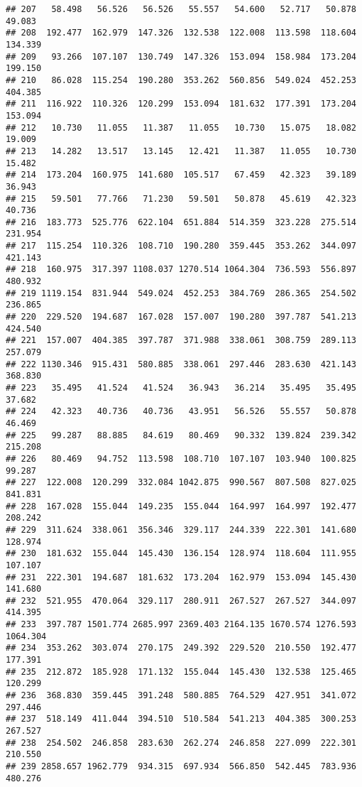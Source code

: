 \documentclass[
]{article}
\begin{document}
\begin{verbatim}
## 207   58.498   56.526   56.526   55.557   54.600   52.717   50.878   49.083
## 208  192.477  162.979  147.326  132.538  122.008  113.598  118.604  134.339
## 209   93.266  107.107  130.749  147.326  153.094  158.984  173.204  199.150
## 210   86.028  115.254  190.280  353.262  560.856  549.024  452.253  404.385
## 211  116.922  110.326  120.299  153.094  181.632  177.391  173.204  153.094
## 212   10.730   11.055   11.387   11.055   10.730   15.075   18.082   19.009
## 213   14.282   13.517   13.145   12.421   11.387   11.055   10.730   15.482
## 214  173.204  160.975  141.680  105.517   67.459   42.323   39.189   36.943
## 215   59.501   77.766   71.230   59.501   50.878   45.619   42.323   40.736
## 216  183.773  525.776  622.104  651.884  514.359  323.228  275.514  231.954
## 217  115.254  110.326  108.710  190.280  359.445  353.262  344.097  421.143
## 218  160.975  317.397 1108.037 1270.514 1064.304  736.593  556.897  480.932
## 219 1119.154  831.944  549.024  452.253  384.769  286.365  254.502  236.865
## 220  229.520  194.687  167.028  157.007  190.280  397.787  541.213  424.540
## 221  157.007  404.385  397.787  371.988  338.061  308.759  289.113  257.079
## 222 1130.346  915.431  580.885  338.061  297.446  283.630  421.143  368.830
## 223   35.495   41.524   41.524   36.943   36.214   35.495   35.495   37.682
## 224   42.323   40.736   40.736   43.951   56.526   55.557   50.878   46.469
## 225   99.287   88.885   84.619   80.469   90.332  139.824  239.342  215.208
## 226   80.469   94.752  113.598  108.710  107.107  103.940  100.825   99.287
## 227  122.008  120.299  332.084 1042.875  990.567  807.508  827.025  841.831
## 228  167.028  155.044  149.235  155.044  164.997  164.997  192.477  208.242
## 229  311.624  338.061  356.346  329.117  244.339  222.301  141.680  128.974
## 230  181.632  155.044  145.430  136.154  128.974  118.604  111.955  107.107
## 231  222.301  194.687  181.632  173.204  162.979  153.094  145.430  141.680
## 232  521.955  470.064  329.117  280.911  267.527  267.527  344.097  414.395
## 233  397.787 1501.774 2685.997 2369.403 2164.135 1670.574 1276.593 1064.304
## 234  353.262  303.074  270.175  249.392  229.520  210.550  192.477  177.391
## 235  212.872  185.928  171.132  155.044  145.430  132.538  125.465  120.299
## 236  368.830  359.445  391.248  580.885  764.529  427.951  341.072  297.446
## 237  518.149  411.044  394.510  510.584  541.213  404.385  300.253  267.527
## 238  254.502  246.858  283.630  262.274  246.858  227.099  222.301  210.550
## 239 2858.657 1962.779  934.315  697.934  566.850  542.445  783.936  480.276

\end{verbatim}
\end{document}
